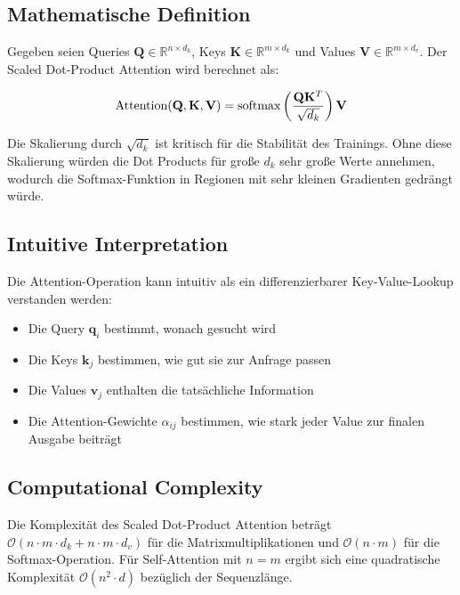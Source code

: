 \subsection{Mathematische Definition}

Gegeben seien Queries $\mathbf{Q} \in \mathbb{R}^{n \times d_k}$, Keys $\mathbf{K} \in \mathbb{R}^{m \times d_k}$ und Values $\mathbf{V} \in \mathbb{R}^{m \times d_v}$. Der Scaled Dot-Product Attention wird berechnet als:

\begin{equation}
\text{Attention}(\mathbf{Q}, \mathbf{K}, \mathbf{V}) = \text{softmax}\left(\frac{\mathbf{Q}\mathbf{K}^T}{\sqrt{d_k}}\right)\mathbf{V}
\label{eq:scaled_dot_product_attention}
\end{equation}

Die Skalierung durch $\sqrt{d_k}$ ist kritisch für die Stabilität des Trainings. Ohne diese Skalierung würden die Dot Products für große $d_k$ sehr große Werte annehmen, wodurch die Softmax-Funktion in Regionen mit sehr kleinen Gradienten gedrängt würde.

\subsection{Intuitive Interpretation}

Die Attention-Operation kann intuitiv als ein differenzierbarer Key-Value-Lookup verstanden werden:
\begin{itemize}
    \item Die Query $\mathbf{q}_i$ bestimmt, wonach gesucht wird
    \item Die Keys $\mathbf{k}_j$ bestimmen, wie gut sie zur Anfrage passen
    \item Die Values $\mathbf{v}_j$ enthalten die tatsächliche Information
    \item Die Attention-Gewichte $\alpha_{ij}$ bestimmen, wie stark jeder Value zur finalen Ausgabe beiträgt
\end{itemize}

\subsection{Computational Complexity}

Die Komplexität des Scaled Dot-Product Attention beträgt $\mathcal{O}(n \cdot m \cdot d_k + n \cdot m \cdot d_v)$ für die Matrixmultiplikationen und $\mathcal{O}(n \cdot m)$ für die Softmax-Operation. Für Self-Attention mit $n = m$ ergibt sich eine quadratische Komplexität $\mathcal{O}(n^2 \cdot d)$ bezüglich der Sequenzlänge.

